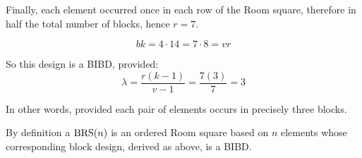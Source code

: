 Finally, each element occurred once in each row of the Room square, therefore in half the total number of blocks, hence $r = 7$.

\begin{equation}
bk = 4\cdot 14 = 7 \cdot 8 = vr
\end{equation}

So this design is a BIBD, provided:
\begin{equation}
\lambda = \frac{r(k - 1)}{v - 1} = \frac{7(3)}{7} = 3
\end{equation}

In other words, provided each pair of elements occurs in precisely three blocks.

By definition a  $\operatorname{BRS}(n)$ is an ordered Room square based on $n$ elements whose corresponding block design, derived as above, is a BIBD.

